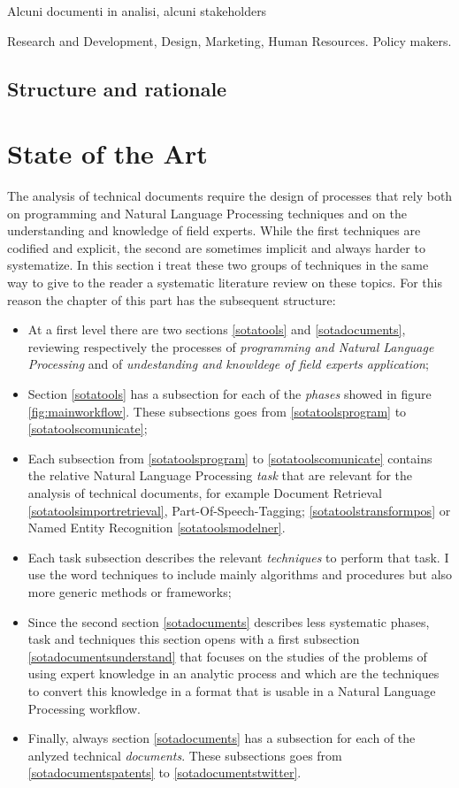 \documentclass[]{book}
\providecommand{\tightlist}{%
  \setlength{\itemsep}{0pt}\setlength{\parskip}{0pt}}
\begin{document}
Alcuni documenti in analisi, alcuni stakeholders

Research and Development, Design, Marketing, Human Resources. Policy
makers.

\chapter{Structure and rationale}\label{structure-and-rationale}

\part{State of the Art}\label{part-state-of-the-art}

The analysis of technical documents require the design of processes that
rely both on programming and Natural Language Processing techniques and
on the understanding and knowledge of field experts. While the first
techniques are codified and explicit, the second are sometimes implicit
and always harder to systematize. In this section i treat these two
groups of techniques in the same way to give to the reader a systematic
literature review on these topics. For this reason the chapter of this
part has the subsequent structure:

\begin{itemize}
\tightlist
\item
  At a first level there are two sections \ref{sotatools} and
  \ref{sotadocuments}, reviewing respectively the processes of
  \emph{programming and Natural Language Processing} and of
  \emph{undestanding and knowldege of field experts application};
\item
  Section \ref{sotatools} has a subsection for each of the \emph{phases}
  showed in figure \ref{fig:mainworkflow}. These subsections goes from
  \ref{sotatoolsprogram} to \ref{sotatoolscomunicate};
\item
  Each subsection from \ref{sotatoolsprogram} to
  \ref{sotatoolscomunicate} contains the relative Natural Language
  Processing \emph{task} that are relevant for the analysis of technical
  documents, for example Document Retrieval
  \ref{sotatoolsimportretrieval}, Part-Of-Speech-Tagging;
  \ref{sotatoolstransformpos} or Named Entity Recognition
  \ref{sotatoolsmodelner}.
\item
  Each task subsection describes the relevant \emph{techniques} to
  perform that task. I use the word techniques to include mainly
  algorithms and procedures but also more generic methods or frameworks;
\item
  Since the second section \ref{sotadocuments} describes less systematic
  phases, task and techniques this section opens with a first subsection
  \ref{sotadocumentsunderstand} that focuses on the studies of the
  problems of using expert knowledge in an analytic process and which
  are the techniques to convert this knowledge in a format that is
  usable in a Natural Language Processing workflow.
\item
  Finally, always section \ref{sotadocuments} has a subsection for each
  of the anlyzed technical \emph{documents}. These subsections goes from
  \ref{sotadocumentspatents} to \ref{sotadocumentstwitter}.
\end{itemize}
\end{document}
